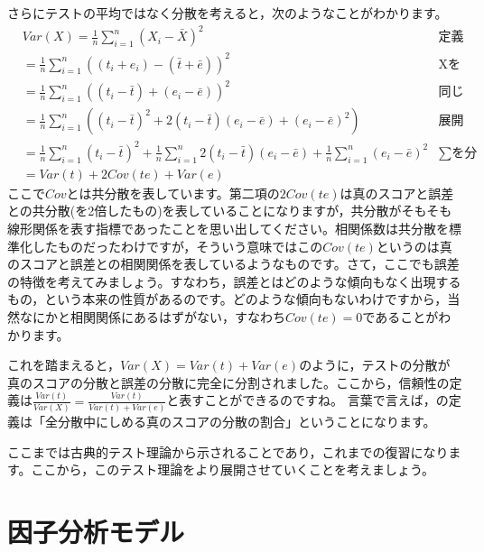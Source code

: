 \documentclass{ltjsbook}
\begin{document}
さらにテストの平均ではなく分散を考えると，次のようなことがわかります。
\begin{align*}
     & Var(X)  =  \frac{1}{n}\sum_{i=1}^n (X_i - \bar{X})^2                                                                                              & \mbox{定義より}         \\
     & = \frac{1}{n}\sum_{i=1}^n  ((t_i + e_i) - (\bar{t} + \bar{e}))^2                                                                                  & \mbox{Xをテスト理論のモデルに} \\
     & = \frac{1}{n}\sum_{i=1}^n (  (t_i - \bar{t}) + (e_i - \bar{e}) )^2                                                                                & \mbox{同じ記号でまとめる}    \\
     & = \frac{1}{n}\sum_{i=1}^n (  (t_i - \bar{t})^2 + 2(t_i - \bar{t})(e_i - \bar{e}) + (e_i - \bar{e})^2  )                                           & \mbox{展開する}         \\
     & = \frac{1}{n}\sum_{i=1}^n (t_i - \bar{t})^2 +\frac{1}{n}\sum_{i=1}^n 2(t_i - \bar{t})(e_i - \bar{e})  + \frac{1}{n}\sum_{i=1}^n (e_i - \bar{e})^2 & \mbox{$\sum$を分配}    \\
     & =  Var(t) + 2Cov(te) + Var(e)
\end{align*}
ここで$Cov$とは共分散を表しています。第二項の$2Cov(te)$は真のスコアと誤差との共分散(を2倍したもの)を表していることになりますが，共分散がそもそも線形関係を表す指標であったことを思い出してください。相関係数は共分散を標準化したものだったわけですが，そういう意味ではこの$Cov(te)$というのは真のスコアと誤差との相関関係を表しているようなものです。さて，ここでも誤差の特徴を考えてみましょう。すなわち，誤差とはどのような傾向もなく出現するもの，という本来の性質があるのです。どのような傾向もないわけですから，当然なにかと相関関係にあるはずがない，すなわち$Cov(te)=0$であることがわかります。

これを踏まえると，$Var(X)=Var(t)+Var(e)$のように，テストの分散が真のスコアの分散と誤差の分散に完全に分割されました。ここから，信頼性の定義は$\frac{Var(t)}{Var(X)}=\frac{Var(t)}{Var(t)+Var(e)}$と表すことができるのですね。
言葉で言えば，の定義は「全分散中にしめる真のスコアの分散の割合」ということになります。

ここまでは古典的テスト理論から示されることであり，これまでの復習になります。ここから，このテスト理論をより展開させていくことを考えましょう。

\section{因子分析モデル}
\end{document}
